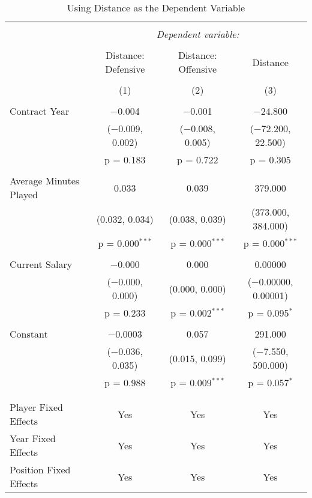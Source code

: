 \documentclass[12pt]{article}
\begin{document}
\begin{landscape}
	\begin{table}[!htbp] \centering 
		\caption{Using Distance as the Dependent Variable} 
		\label{} 
		\begin{tabular}{@{\extracolsep{5pt}}lccc} 
			\\[-1.8ex]\hline 
			\hline \\[-1.8ex] 
			& \multicolumn{3}{c}{\textit{Dependent variable:}} \\ 
			\cline{2-4} 
			\\[-1.8ex] & Distance: Defensive & Distance: Offensive & Distance \\ 
			\\[-1.8ex] & (1) & (2) & (3)\\ 
			\hline \\[-1.8ex] 
			Contract Year & $-$0.004 & $-$0.001 & $-$24.800 \\ 
			& ($-$0.009, 0.002) & ($-$0.008, 0.005) & ($-$72.200, 22.500) \\ 
			& p = 0.183 & p = 0.722 & p = 0.305 \\ 
			& & & \\ 
			Average Minutes Played & 0.033 & 0.039 & 379.000 \\ 
			& (0.032, 0.034) & (0.038, 0.039) & (373.000, 384.000) \\ 
			& p = 0.000$^{***}$ & p = 0.000$^{***}$ & p = 0.000$^{***}$ \\ 
			& & & \\ 
			Current Salary & $-$0.000 & 0.000 & 0.00000 \\ 
			& ($-$0.000, 0.000) & (0.000, 0.000) & ($-$0.00000, 0.00001) \\ 
			& p = 0.233 & p = 0.002$^{***}$ & p = 0.095$^{*}$ \\ 
			& & & \\ 
			Constant & $-$0.0003 & 0.057 & 291.000 \\ 
			& ($-$0.036, 0.035) & (0.015, 0.099) & ($-$7.550, 590.000) \\ 
			& p = 0.988 & p = 0.009$^{***}$ & p = 0.057$^{*}$ \\ 
			& & & \\ 
			\hline \\[-1.8ex] 
			Player Fixed Effects & Yes & Yes & Yes \\ 
			Year Fixed Effects & Yes & Yes & Yes \\ 
			Position Fixed Effects & Yes & Yes & Yes \\ 

\end{tabular}
\end{table}
\end{landscape}
\end{document}
